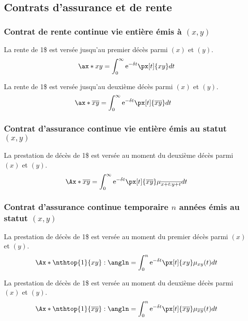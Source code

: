 \documentclass[10pt, french]{article}
\begin{document}
\begin{multicols*}{2}
\subsection*{Contrats d'assurance et de rente}
\subsubsection*{Contrat de rente continue vie entière émis à $(x, y)$}

La rente de 1\$ est versée jusqu'au premier décès parmi $(x)$ et $(y)$.
\begin{align*}
	\ax*{xy}
	&=	\int_{0}^{\infty} \textrm{e}^{-\delta t} \px[t]{xy} dt	\\
\end{align*}

La rente de 1\$ est versée jusqu'au deuxième décès parmi $(x)$ et $(y)$.
\begin{align*}
	\ax*{\overline{xy}}
	&=	\int_{0}^{\infty} \textrm{e}^{-\delta t} \px[t]{\overline{xy}} dt	
\end{align*}


\subsubsection*{Contrat d'assurance continue vie entière émis au statut $(x, y)$}
La prestation de décès de 1\$ est versée au moment du deuxième décès parmi $(x)$ et $(y)$.
\begin{align*}
	\Ax*{\overline{xy}}
	&=	\int_{0}^{\infty} \textrm{e}^{-\delta t} \px[t]{\overline{xy}} \mu_{\overline{x + t : y + t}} dt	\\
\end{align*}

\subsubsection*{Contrat d'assurance continue temporaire $n$ années émis au statut $(x, y)$}
La prestation de décès de 1\$ est versée au moment du premier décès parmi $(x)$ et $(y)$.
\begin{align*}
	\Ax*{\nthtop{1}{xy}:\angln}
	&=	\int_{0}^{n} \textrm{e}^{-\delta t} \px[t]{xy} \mu_{xy}(t) dt	\\
\end{align*}

La prestation de décès de 1\$ est versée au moment du deuxième décès parmi $(x)$ et $(y)$.
\begin{align*}
	\Ax*{\nthtop{1}{\overline{xy}}:\angln}
	&=	\int_{0}^{n} \textrm{e}^{-\delta t} \px[t]{\overline{xy}} \mu_{\overline{xy}}(t) dt	\\
\end{align*}


\end{multicols*}
\end{document}
